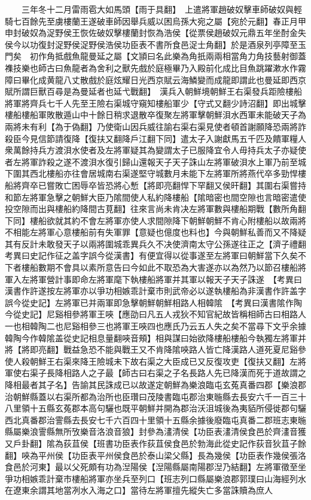 　　三年冬十二月雷雨雹大如馬頭【雨于具翻】　上遣將軍趙破奴擊車師破奴與輕騎七百餘先至虜樓蘭王遂破車師因舉兵威以困烏孫大宛之屬【宛於元翻】春正月甲申封破奴為浞野侯王恢佐破奴擊樓蘭封恢為浩侯【從票侯趙破奴元鼎五年坐酎金失侯今以功復封浞野侯浞野侯浩侯功臣表不書所食邑浞士角翻】於是酒泉列亭障至玉門矣　初作角抵戲魚龍曼延之屬【文頴曰名此樂為角扺兩兩相當角力角技藝射御蓋襍技樂也師古曰魚龍者為舍利之獸先戲於庭極畢乃入殿前化成比目魚跳躍漱水作霧障曰畢化成黄龍八丈散戲於庭炫耀日光西京賦云海鱗變而成龍即謂此也曼延即西京賦所謂巨獸百尋是為曼延者也延弋戰翻】　漢兵入朝鮮境朝鮮王右渠發兵距險樓船將軍將齊兵七千人先至王險右渠城守窺知樓船軍少【守式又翻少詩沼翻】即出城擊樓船樓船軍敗散遁山中十餘日稍求退散卒復聚左將軍擊朝鮮浿水西軍未能破天子為兩將未有利【為于偽翻】乃使衛山因兵威往諭右渠右渠見使者頓首謝願降恐兩將詐殺臣今見信節請復降【復扶又翻降戶江翻下同】遣太子入謝獻馬五千匹及饋軍糧人衆萬餘持兵方渡浿水使者及左將軍疑其為變謂太子已服降宜令人毋持兵太子亦疑使者左將軍詐殺之遂不渡浿水復引歸山還報天子天子誅山左將軍破浿水上軍乃前至城下圍其西北樓船亦往會居城南右渠遂堅守城數月未能下左將軍所將燕代卒多勁悍樓船將齊卒已嘗敗亡困辱卒皆恐將心慙【將即亮翻悍下罕翻又侯旰翻】其圍右渠嘗持和節左將軍急擊之朝鮮大臣乃隂間使人私約降樓船【隂暗密也間空隙也言暗密遣使投空隙而出與樓船約降間古莧翻】往來言尚未肯决左將軍數與樓船期戰【數所角翻下同】樓船欲就其約不會左將軍亦使人求間隙降下朝鮮朝鮮不肯心附樓船以故兩將不相能左將軍心意樓船前有失軍罪【意疑也億度也料也】今與朝鮮私善而又不降疑其有反計未敢發天子以兩將圍城乖異兵久不决使濟南太守公孫遂往正之【濟子禮翻考異曰史記作征之盖字誤今從漢書】有便宜得以從事遂至左將軍曰朝鮮當下久矣不下者樓船數期不會具以素所意告曰今如此不取恐為大害遂亦以為然乃以節召樓船將軍入左將軍營計事即命左將軍麾下執樓船將軍并其軍以報天子天子誅遂　【考異曰漢書作許遂按左將軍亦以爭功相嫉乖計棄市則武帝必以遂執樓船為非漢書作許盖字誤今從史記】左將軍已并兩軍即急擊朝鮮朝鮮相路人相韓隂　【考異曰漢書隂作陶今從史記】尼谿相參將軍王唊【應劭曰凡五人戎狄不知官紀故皆稱相師古曰相路人一也相韓陶二也尼谿相參三也將軍王唊四也應氏乃云五人失之矣不當尋下文乎余據韓陶今作韓隂盖從史記相息量翻唊音頰】相與謀曰始欲降樓船樓船今執獨左將軍并將【將即亮翻】戰益急恐不能與戰王又不肯降隂唊路人皆亡降漢路人道死夏尼谿參使人殺朝鮮王右渠來降王險城未下故右渠之大臣成已又反復攻吏【復扶又翻】左將軍使右渠子長降相路人之子最【師古曰右渠之子名長路人先已降漢而死于道故謂之降相最者其子名】告諭其民誅成已以故遂定朝鮮為樂浪臨屯玄菟真番四郡【樂浪郡治朝鮮縣蓋以右渠所都為治所也臣瓚曰茂陵書臨屯郡治東暆縣去長安六千一百三十八里領十五縣玄菟郡本高句驪也既平朝鮮并開為郡治沃沮城後為夷貊所侵徙郡句驪西北真番郡治霅縣去長安七千六百四十里領十五縣余據後廢臨屯真番二郡班志東暆縣屬樂浪霅縣無所攷樂音洛浪音狼】封參為澅清侯【功臣表澅清侯食邑於齊澅音獲又戶卦翻】隂為荻苴侯【班書功臣表作荻苴侯食邑於勃海此從史記作荻音狄苴子餘翻】唊為平州侯【功臣表平州侯食邑於泰山梁父縣】長為幾侯【功臣表作幾侯張洛食邑於河東】最以父死頗有功為湼陽侯【湼陽縣屬南陽郡湼乃結翻】左將軍徵至坐爭功相嫉乖計棄市樓船將軍亦坐兵至列口【班志列口縣屬樂浪郡郭璞曰山海經列水在遼東余謂其地當冽水入海之口】當待左將軍擅先縱失亡多當誅贖為庶人

